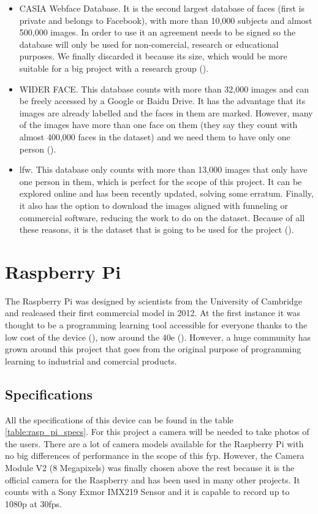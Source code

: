 \begin{itemize}
	\item CASIA Webface Database. It is the second largest database of faces (first is private and belongs to Facebook), with more than 10,000 subjects and almost 500,000 images. In order to use it an agreement needs to be signed so the database will only be used for non-comercial, research or educational purposes. We finally discarded it because its size, which would be more suitable for a big project with a research group (\cite{casia_db}). 
	\item WIDER FACE. This database counts with more than 32,000 images and can be freely accessed by a Google or Baidu Drive. It has the advantage that its images are already labelled and the faces in them are marked. However, many of the images have more than one face on them (they say they count with almost 400,000 faces in the dataset) and we need them to have only one person (\cite{widerf_db}).
	\item \gls{lfw}. This database only counts with more than 13,000 images that only have one person in them, which is perfect for the scope of this project. It can be explored online and has been recently updated, solving some erratum. Finally, it also has the option to download the images aligned with funneling or commercial software, reducing the work to do on the dataset. Because of all these reasons, it is the dataset that is going to be used for the project (\cite{lfw_db}).
\end{itemize}

\section{Raspberry Pi}	
\label{sec:rasp_pi}
The Raspberry Pi was designed by scientists from the University of Cambridge and realeased their first commercial model in 2012. At the first instance it was thought to be a programming learning tool accessible for everyone thanks to the low cost of the device (\cite{raspberry_pi_for_learning}), now around the 40e (\cite{price_raspberry_pi}). However, a huge community has grown around this project that goes from the original purpose of programming learning to industrial and comercial products.

	\subsection{Specifications}
	All the specifications of this device can be found in the table \ref{table:rasp_pi_specs}. For this project a camera will be needed to take photos of the users. There are a lot of camera models available for the Raspberry Pi with no big differences of performance in the scope of this \gls{fyp}. However, the Camera Module V2 (8 Megapixels) was finally chosen above the rest because it is the official camera for the Raspberry and has been used in many other projects. It counts with a Sony Exmor IMX219 Sensor and it is capable to record up to 1080p at 30fps.

